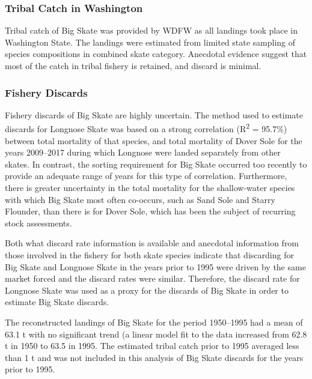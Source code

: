 \documentclass[12pt,]{article}
\begin{document}
\hypertarget{tribal-catch-in-washington}{%
\subsubsection{Tribal Catch in
Washington}\label{tribal-catch-in-washington}}

Tribal catch of Big Skate was provided by WDFW as all landings took
place in Washington State. The landings were estimated from limited
state sampling of species compositions in combined skate category.
Anecdotal evidence suggest that most of the catch in tribal fishery is
retained, and discard is minimal.

\hypertarget{fishery-discards}{%
\subsubsection{Fishery Discards}\label{fishery-discards}}

Fishery discards of Big Skate are highly uncertain. The method used to
estimate discards for Longnose Skate was based on a strong correlation
(R\textsuperscript{2} = 95.7\%) between total mortality of that species,
and total mortality of Dover Sole for the years 2009--2017 during which
Longnose were landed separately from other skates. In contrast, the
sorting requirement for Big Skate occurred too recently to provide an
adequate range of years for this type of correlation. Furthermore, there
is greater uncertainty in the total mortality for the shallow-water
species with which Big Skate most often co-occurs, such as Sand Sole and
Starry Flounder, than there is for Dover Sole, which has been the
subject of recurring stock assessments.

Both what discard rate information is available and anecdotal
information from those involved in the fishery for both skate species
indicate that discarding for Big Skate and Longnose Skate in the years
prior to 1995 were driven by the same market forced and the discard
rates were similar. Therefore, the discard rate for Longnose Skate was
used as a proxy for the discards of Big Skate in order to estimate Big
Skate discards.

The reconstructed landings of Big Skate for the period 1950--1995 had a
mean of 63.1 t with no significant trend (a linear model fit to the data
increased from 62.8 t in 1950 to 63.5 in 1995. The estimated tribal
catch prior to 1995 averaged less than 1 t and was not included in this
analysis of Big Skate discards for the years prior to 1995.
\end{document}
